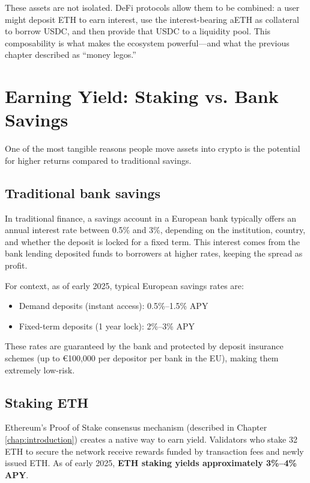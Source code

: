 These assets are not isolated. DeFi protocols allow them to be combined: a user might deposit ETH to earn interest, use the interest-bearing aETH as collateral to borrow USDC, and then provide that USDC to a liquidity pool. This composability is what makes the ecosystem powerful---and what the previous chapter described as ``money legos.''

\section{Earning Yield: Staking vs. Bank Savings}

One of the most tangible reasons people move assets into crypto is the potential for higher returns compared to traditional savings.

\subsection{Traditional bank savings}

In traditional finance, a savings account in a European bank typically offers an annual interest rate between 0.5\% and 3\%, depending on the institution, country, and whether the deposit is locked for a fixed term. This interest comes from the bank lending deposited funds to borrowers at higher rates, keeping the spread as profit.

For context, as of early 2025, typical European savings rates are:
\begin{itemize}
    \item Demand deposits (instant access): 0.5\%--1.5\% APY
    \item Fixed-term deposits (1 year lock): 2\%--3\% APY
\end{itemize}

These rates are guaranteed by the bank and protected by deposit insurance schemes (up to \euro{100,000} per depositor per bank in the EU), making them extremely low-risk.

\subsection{Staking ETH}

Ethereum's Proof of Stake consensus mechanism (described in Chapter \ref{chap:introduction}) creates a native way to earn yield. Validators who stake 32 ETH to secure the network receive rewards funded by transaction fees and newly issued ETH. As of early 2025, \textbf{ETH staking yields approximately 3\%--4\% APY}.

